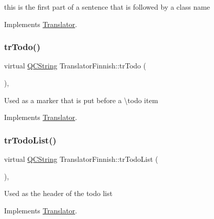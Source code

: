 this is the first part of a sentence that is followed by a class name 

Implements \mbox{\hyperlink{class_translator}{Translator}}.

\mbox{\label{class_translator_finnish_a9cf3f0231cfc71a6d169dacf631e7f9c}} 
\subsubsection{\texorpdfstring{trTodo()}{trTodo()}}
{\footnotesize\ttfamily virtual \mbox{\hyperlink{class_q_c_string}{Q\+C\+String}} Translator\+Finnish\+::tr\+Todo (\begin{DoxyParamCaption}{ }\end{DoxyParamCaption})\hspace{0.3cm}{\ttfamily [inline]}, {\ttfamily [virtual]}}

Used as a marker that is put before a \textbackslash{}todo item 

Implements \mbox{\hyperlink{class_translator}{Translator}}.

\mbox{\label{class_translator_finnish_a90721ca80c1038754d4e3d986310f7fb}} 
\subsubsection{\texorpdfstring{trTodoList()}{trTodoList()}}
{\footnotesize\ttfamily virtual \mbox{\hyperlink{class_q_c_string}{Q\+C\+String}} Translator\+Finnish\+::tr\+Todo\+List (\begin{DoxyParamCaption}{ }\end{DoxyParamCaption})\hspace{0.3cm}{\ttfamily [inline]}, {\ttfamily [virtual]}}

Used as the header of the todo list 

Implements \mbox{\hyperlink{class_translator}{Translator}}.

\mbox{\label{class_translator_finnish_aee57cf3efd22a5f62b99b4f9d5903d97}} 
